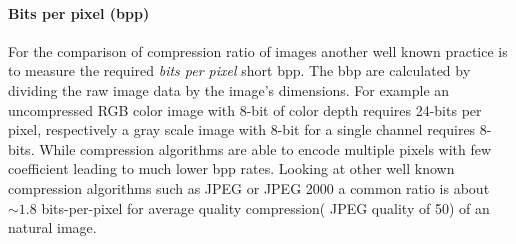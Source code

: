 \paragraph{Bits per pixel (bpp)} 
For the comparison of compression ratio of images another well known practice is
to measure the required \emph{bits per pixel} short bpp. The bbp are calculated
by dividing the raw image data by the image's dimensions. For example an
uncompressed RGB color image with 8-bit of color depth requires 24-bits per
pixel, respectively a gray scale image with 8-bit for a single channel requires
8-bits. While compression algorithms are able to encode multiple pixels with few
coefficient leading to much lower bpp rates.
Looking at other well known compression algorithms such as JPEG or
JPEG 2000 a common ratio is about $\sim1.8$ bits-per-pixel for average
quality compression( JPEG quality of 50) of an natural image. 


